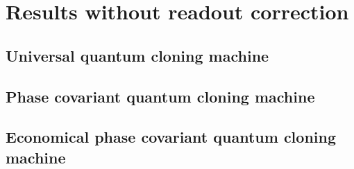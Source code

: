 \chapter{Results without readout correction}
\label{sec:appendix-a}
\section{Universal quantum cloning machine}
\section{Phase covariant quantum cloning machine}
\section{Economical phase covariant quantum cloning machine}